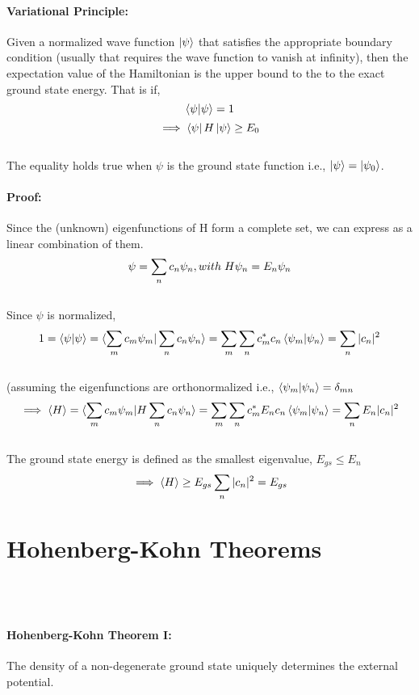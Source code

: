 \documentclass[12pt]{article}
\begin{document}
\paragraph{Variational Principle:}

Given a normalized wave function $\ket{\psi}$ that satisfies the appropriate boundary condition (usually that
 requires the wave function to vanish at infinity), then the expectation value of the Hamiltonian is the upper bound to
  the to the exact ground state energy. That is if, 
\[ \braket{\psi | \psi} = 1\]
\[ \implies \bra{\psi}H\ket{\psi} \geq E_0 \]
\\
The equality holds true when $\psi$ is the ground state function i.e., $\ket{\psi} = \ket{\psi_0}$.
\\
\paragraph{Proof:}

Since the (unknown) eigenfunctions of H form a complete set, we can express as a linear combination of them.
\[ \psi = \sum_n c_n \psi_n , with \hspace{0.1cm} H \psi_n = E_n \psi_n \]
\\
Since $\psi$ is normalized, 
\[ 1 = \braket{\psi | \psi} = \braket{\sum_m c_m \psi_m | \sum_n c_n \psi_n}  = \sum_m \sum_n c_m^* c_n 
\braket{\psi_m | \psi_n} = \sum_n |c_n|^2 \]
\\
(assuming the eigenfunctions are orthonormalized i.e., $\braket{\psi_m | \psi_n} = \delta_{mn}$
\[ \implies \braket{H} = \braket{\sum_m c_m \psi_m | H \sum_n c_n \psi_n} = \sum_m \sum_n c_m^* E_n c_n 
\braket{\psi_m | \psi_n} = \sum_n E_n |c_n|^2 \]
\\
The ground state energy is defined as the smallest eigenvalue, $E_{gs} \leq E_n $
\[ \implies \braket{H} \geq E_{gs} \sum_n |c_n|^2 = E_{gs}\]


\section{Hohenberg-Kohn Theorems}

\\
\\
\paragraph{Hohenberg-Kohn Theorem I:}
The density of a non-degenerate ground state uniquely determines the external potential.
\end{document}
